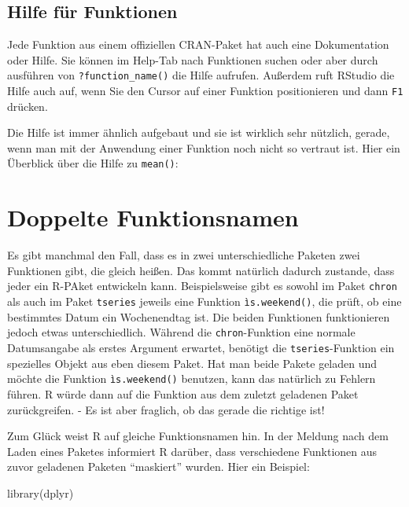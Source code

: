 \documentclass[
]{book}
\newenvironment{Shaded}{\begin{snugshade}}{\end{snugshade}}
\newcommand{\FunctionTok}[1]{\textcolor[rgb]{0.00,0.00,0.00}{#1}}
\newcommand{\NormalTok}[1]{#1}
\begin{document}
\hypertarget{hilfe-fuxfcr-funktionen}{%
\subsection{Hilfe für Funktionen}\label{hilfe-fuxfcr-funktionen}}

Jede Funktion aus einem offiziellen CRAN-Paket hat auch eine Dokumentation oder Hilfe. Sie können im Help-Tab nach Funktionen suchen oder aber durch ausführen von \texttt{?function\_name()} die Hilfe aufrufen. Außerdem ruft RStudio die Hilfe auch auf, wenn Sie den Cursor auf einer Funktion positionieren und dann \texttt{F1} drücken.

Die Hilfe ist immer ähnlich aufgebaut und sie ist wirklich sehr nützlich, gerade, wenn man mit der Anwendung einer Funktion noch nicht so vertraut ist. Hier ein Überblick über die Hilfe zu \texttt{mean()}:

\hypertarget{doppelte-funktionsnamen}{%
\section{Doppelte Funktionsnamen}\label{doppelte-funktionsnamen}}

Es gibt manchmal den Fall, dass es in zwei unterschiedliche Paketen zwei Funktionen gibt, die gleich heißen. Das kommt natürlich dadurch zustande, dass jeder ein R-PAket entwickeln kann. Beispielsweise gibt es sowohl im Paket \texttt{chron} als auch im Paket \texttt{tseries} jeweils eine Funktion \texttt{ìs.weekend()}, die prüft, ob eine bestimmtes Datum ein Wochenendtag ist. Die beiden Funktionen funktionieren jedoch etwas unterschiedlich. Während die \texttt{chron}-Funktion eine normale Datumsangabe als erstes Argument erwartet, benötigt die \texttt{tseries}-Funktion ein spezielles Objekt aus eben diesem Paket. Hat man beide Pakete geladen und möchte die Funktion \texttt{ìs.weekend()} benutzen, kann das natürlich zu Fehlern führen. R würde dann auf die Funktion aus dem zuletzt geladenen Paket zurückgreifen. - Es ist aber fraglich, ob das gerade die richtige ist!

Zum Glück weist R auf gleiche Funktionsnamen hin. In der Meldung nach dem Laden eines Paketes informiert R darüber, dass verschiedene Funktionen aus zuvor geladenen Paketen ``maskiert'' wurden. Hier ein Beispiel:

\begin{Shaded}
\begin{Highlighting}[]
\FunctionTok{library}\NormalTok{(dplyr)}
\end{Highlighting}
\end{Shaded}
\end{document}
